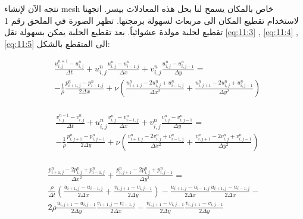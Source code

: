 نتجه الآن لإنشاء mesh خاص بالمكان يسمح لنا بحل هذه المعادلات بيسر. اتجهنا لاستخدام تقطيع المكان الى مربعات لسهولة برمجتها. تظهر الصورة في الملحق رقم 1 تقطيع لحلبة مولدة عشوائياً. بعد تقطيع الحلبة يمكن بسهولة نقل \ref{eq:11:3} , \ref{eq:11:4} , \ref{eq:11:5} الى المتقطع بالشكل:

\begin{equation}
\begin{matrix}&\frac{u_{i,j}^{n+1}-u_{i,j}^n}{\Delta t}+u_{i,j}^n\frac{u_{i,j}^n-u_{i-1,j}^n}{\Delta x}+v_{i,j}^n\frac{u_{i,j}^n-u_{i,j-1}^n}{\Delta y}=\\&-\frac{1}{\rho}\frac{p_{i+1,j}^n-p_{i-1,j}^n}{2\Delta x}+\nu\left(\frac{u_{i+1,j}^n-2u_{i,j}^n+u_{i-1,j}^n}{\Delta x^2}+\frac{u_{i,j+1}^n-2u_{i,j}^n+u_{i,j-1}^n}{\Delta y^2}\right)\\\end{matrix}
\end{equation}

\begin{equation}
\begin{matrix}&\frac{v_{i,j}^{n+1}-v_{i,j}^n}{\Delta t}+u_{i,j}^n\frac{v_{i,j}^n-v_{i-1,j}^n}{\Delta x}+v_{i,j}^n\frac{v_{i,j}^n-v_{i,j-1}^n}{\Delta y}=\\&-\frac{1}{\rho}\frac{p_{i,j+1}^n-p_{i,j-1}^n}{2\Delta y}+\nu\left(\frac{v_{i+1,j}^n-2v_{i,j}^n+v_{i-1,j}^n}{\Delta x^2}+\frac{v_{i,j+1}^n-2v_{i,j}^n+v_{i,j-1}^n}{\Delta y^2}\right)\\\end{matrix}
\end{equation}




\begin{equation}
\begin{matrix}

\frac{p_{i+1,j}^n-2p_{i,j}^n+p_{i-1,j}^n}{\Delta x^2}+\frac{p_{i,j+1}^n-2p_{i,j}^n+p_{i,j-1}^n}{\Delta y^2} =


\\

\frac{\rho}{\Delta t}\left(\frac{u_{i+1,j}-u_{i-1,j}}{2\Delta x}+\frac{v_{i,j+1}-v_{i,j-1}}{2\Delta y}\right)-\frac{u_{i+1,j}-u_{i-1,j}}{2\Delta x}\frac{u_{i+1,j}-u_{i-1,j}}{2\Delta x} - 
\\
2\rho \frac{u_{i,j+1}-u_{i,j-1}}{2\Delta y}\frac{v_{i+1,j}-v_{i-1,j}}{2\Delta x}-\frac{v_{i,j+1}-v_{i,j-1}}{2\Delta y}\frac{v_{i,j+1}-v_{i,j-1}}{2\Delta y}

\end{matrix}
\end{equation}

